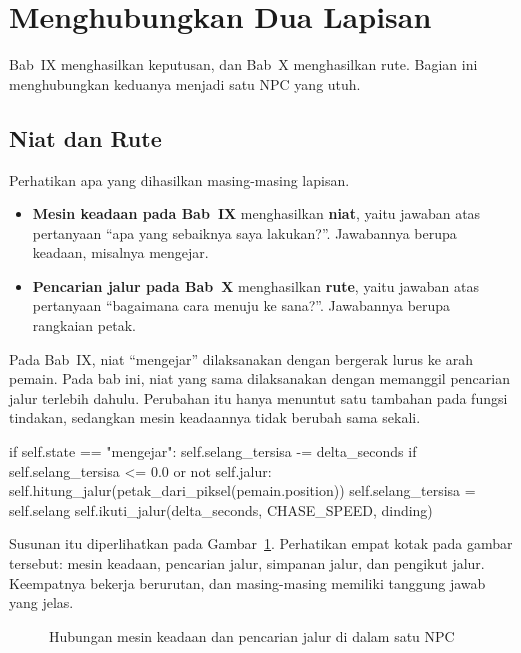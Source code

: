 \section{Menghubungkan Dua Lapisan}
\label{sec:hubung-lapisan}

Bab~IX menghasilkan keputusan, dan Bab~X menghasilkan rute. Bagian ini
menghubungkan keduanya menjadi satu NPC yang utuh.

\subsection{Niat dan Rute}

Perhatikan apa yang dihasilkan masing-masing lapisan.

\begin{itemize}
  \item \textbf{Mesin keadaan pada Bab~IX} menghasilkan \textbf{niat}, yaitu
        jawaban atas pertanyaan ``apa yang sebaiknya saya lakukan?''. Jawabannya
        berupa keadaan, misalnya mengejar.
  \item \textbf{Pencarian jalur pada Bab~X} menghasilkan \textbf{rute}, yaitu
        jawaban atas pertanyaan ``bagaimana cara menuju ke sana?''. Jawabannya
        berupa rangkaian petak.
\end{itemize}

Pada Bab~IX, niat ``mengejar'' dilaksanakan dengan bergerak lurus ke arah
pemain. Pada bab ini, niat yang sama dilaksanakan dengan memanggil pencarian
jalur terlebih dahulu. Perubahan itu hanya menuntut satu tambahan pada fungsi
tindakan, sedangkan mesin keadaannya tidak berubah sama sekali.

\begin{kodekeluaran}
if self.state == "mengejar":
    self.selang_tersisa -= delta_seconds
    if self.selang_tersisa <= 0.0 or not self.jalur:
        self.hitung_jalur(petak_dari_piksel(pemain.position))
        self.selang_tersisa = self.selang
    self.ikuti_jalur(delta_seconds, CHASE_SPEED, dinding)
\end{kodekeluaran}

Susunan itu diperlihatkan pada Gambar~\ref{fig:arsitektur-integrasi}. Perhatikan
empat kotak pada gambar tersebut: mesin keadaan, pencarian jalur, simpanan
jalur, dan pengikut jalur. Keempatnya bekerja berurutan, dan masing-masing
memiliki tanggung jawab yang jelas.

\begin{figure}[htbp]
\centering

\caption{Hubungan mesin keadaan dan pencarian jalur di dalam satu NPC}
\label{fig:arsitektur-integrasi}
\end{figure}


